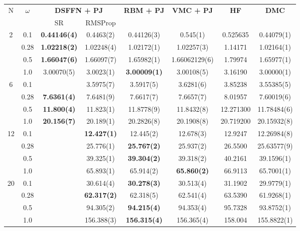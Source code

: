 \begin{table}[H]
    \centering
    \begin{tabular}{c|c|cc|c|c|c|c}
    \toprule
    N & $\omega$ & \multicolumn{2}{c|}{\textbf{DSFFN + PJ}} & \textbf{RBM + PJ} & \textbf{VMC + PJ} & \textbf{HF} \cite{mariadasonQuantum} & \textbf{DMC} \cite{hogberget2013quantum} \\
    & & SR & RMSProp & & & & \\
    \midrule
    \multirow{4}{*}{2} & 0.1 & \textbf{0.44146(4)} & 0.4463(2) & 0.44126(3) & 0.545(1) & 0.525635 & 0.44079(1) \\
    & 0.28 &\textbf{1.02218(2)} & 1.02248(4) & 1.02172(1) & 1.02257(3) & 1.14171 & 1.02164(1) \\
    & 0.5 & \textbf{1.66047(6)} & 1.66097(7) & 1.65982(1) & 1.66062129(6) & 1.79974 & 1.65977(1) \\
    & 1.0 & 3.00070(5) & 3.0023(1) & \textbf{3.00009(1)} & 3.00108(5) & 3.16190 & 3.00000(1) \\
    \midrule
    \multirow{4}{*}{6} & 0.1 & & 3.5975(7) & 3.5917(5) & 3.6281(6) & 3.85238 & 3.55385(5) \\
    & 0.28 &\textbf{7.6361(4)} & 7.6481(9) & 7.6617(7) & 7.6657(7) & 8.01957 & 7.60019(6) \\
    & 0.5 & \textbf{11.800(4)} & 11.823(1) & 11.8778(9) & 11.8432(8) & 12.271300 & 11.78484(6) \\
    & 1.0 & \textbf{20.156(7)}& 20.189(1) & 20.2826(8) & 20.1908(8) & 20.719200 & 20.15932(8) \\
    \midrule
    \multirow{4}{*}{12} & 0.1 & & \textbf{12.427(1)} & 12.445(2) & 12.678(3) & 12.9247 & 12.26984(8) \\
    & 0.28 & & 25.776(1) & \textbf{25.767(2)} & 25.937(2) & 26.5500 & 25.63577(9) \\
    & 0.5 & & 39.325(1) & \textbf{39.304(2)} & 39.318(2) & 40.2161 & 39.1596(1) \\
    & 1.0 & & 65.893(1) & 65.914(2) & \textbf{65.860(2)} & 66.9113 & 65.7001(1) \\
    \midrule
    \multirow{4}{*}{20} & 0.1 & & 30.614(4) & \textbf{30.278(3)} & 30.513(4) & 31.1902 & 29.9779(1) \\
    & 0.28 & & \textbf{62.317(2)} & 62.318(5) & 62.541(4) & 63.5390 & 61.9268(1) \\
    & 0.5 & & 94.305(2) & \textbf{94.215(4)} & 94.353(4) & 95.7328 & 93.8752(1) \\
    & 1.0 & & 156.388(3) & \textbf{156.315(4)} & 156.365(4) & 158.004 & 155.8822(1) \\

\end{tabular}
\end{table}

